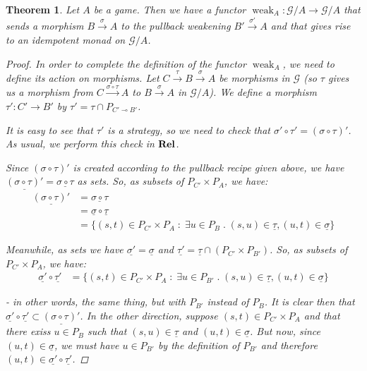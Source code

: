 \documentclass[11pt]{article} %
\theoremstyle{plain} %
\newtheorem{theorem}{Theorem}[section]
\theoremstyle{definition} %
\theoremstyle{exercisestyle}
\newcommand{\catname}[1]{{\normalfont\textbf{#1}}}
\newcommand{\Rel}{\catname{Rel}}
\newcommand{\map}[3]{#2\xrightarrow{#1} #3}
\newcommand*\from{\colon}
\newcommand{\cmap}[3]{#1\from{}#2\to{}#3}
\renewcommand{\implies}{\multimap}
\newcommand{\comp}[2]{#1 \circ #2}
\newcommand{\G}{\mathcal G}
\newcommand{\suchthat}{\;\colon\;}
\newcommand{\esuchthat}{\;.\;}
\DeclareMathOperator{\weak}{weak}
\newcommand{\grel}[1]{\underline{#1}}
\begin{document}
\begin{theorem}
  Let $A$ be a game.  Then we have a functor $\cmap{\weak_A}{\G/A}{\G/A}$ that sends a morphism $\map{\sigma}{B}{A}$ to the pullback weakening $\map{\sigma'}{B'}{A}$ and that gives rise to an idempotent monad on $\G/A$.

  \begin{proof}
    In order to complete the definition of the functor $\weak_A$, we need to define its action on morphisms.  Let $C\xrightarrow{\tau}\map{\sigma}{B}{A}$ be morphisms in $\G$ (so $\tau$ gives us a morphism from $\map{\comp\sigma\tau}{C}{A}$ to $\map{\sigma}{B}{A}$ in $\G/A$).  We define a morphism $\cmap{\tau'}{C'}{B'}$ by $\tau'=\tau\cap P_{C'\implies B'}$.

    It is easy to see that $\tau'$ is a strategy, so we need to check that $\comp{\sigma'}{\tau'}=(\comp\sigma\tau)'$.  As usual, we perform this check in $\Rel$.

    Since $(\comp\sigma\tau)'$ is created according to the pullback recipe given above, we have $\grel{(\comp\sigma\tau)'}=\grel{\comp\sigma\tau}$ as sets.  So, as subsets of $P_{C'}\times P_A$, we have:
    \begin{align*}
      \grel{(\comp\sigma\tau)'} & = \grel{\comp\sigma\tau} \\
                                & = \comp{\grel\sigma}{\grel\tau} \\
                                & = \{(s, t)\in P_{C'}\times P_{A}\suchthat \exists u\in P_B \esuchthat (s,u)\in\grel\tau, (u,t)\in\grel\sigma\}
    \end{align*}

    Meanwhile, as sets we have $\grel{\sigma'}=\grel\sigma$ and $\grel{\tau'}=\grel\tau\cap (P_{C'}\times P_{B'})$.  So, as subsets of $P_{C'}\times P_A$, we have:
    \begin{align*}
      \comp{\grel{\sigma'}}{\grel{\tau'}} & = \{(s, t)\in P_{C'}\times P_A\suchthat \exists u\in P_{B'} \esuchthat (s,u)\in\grel\tau, (u,t)\in\grel\sigma\}
    \end{align*}

     - in other words, the same thing, but with $P_{B'}$ instead of $P_B$.  It is clear then that $\comp{\grel{\sigma'}}{\grel{\tau'}}\subset\grel{(\comp\sigma\tau)'}$.  In the other direction, suppose $(s,t)\in P_{C'}\times P_A$ and that there exiss $u\in P_B$ such that $(s,u)\in\grel\tau$ and $(u,t)\in\grel\sigma$.  But now, since $(u,t)\in\grel\sigma$, we must have $u\in P_{B'}$ by the definition of $P_{B'}$ and therefore $(u,t)\in \comp{\grel{\sigma'}}{\grel{\tau'}}$.


\end{proof}
\end{theorem}
\end{document}

